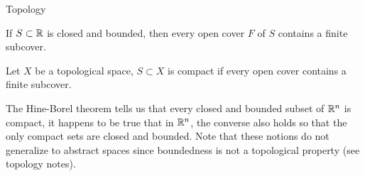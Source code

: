 \begin{chapter}{Topology}
    \begin{thm}
        If $S \subset \mathbb{R}$ is closed and bounded, then every open cover $F$ of $S$ contains 
        a finite subcover. 
    \end{thm}

    \begin{defn}
        Let $X$ be a topological space, $S \subset X$ is compact if every open cover contains a finite subcover.
    \end{defn}

    The Hine-Borel theorem tells us that every closed and bounded subset of $\mathbb{R}^n$ is compact, it happens to be true that 
    in $\mathbb{R}^n$, the converse also holds so that the only compact sets are closed and bounded. Note that these notions do not 
    generalize to abstract spaces since boundedness is not a topological property (see topology notes). 


\end{chapter}